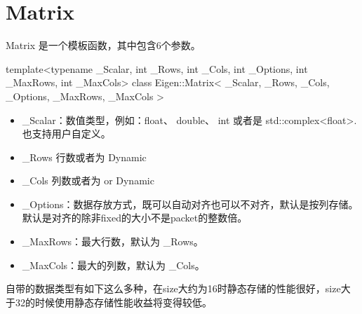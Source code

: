 \section{Matrix}
Matrix 是一个模板函数，其中包含6个参数。
\begin{cpp}
template<typename _Scalar, int _Rows, int _Cols, int _Options, int _MaxRows, int _MaxCols>
class Eigen::Matrix< _Scalar, _Rows, _Cols, _Options, _MaxRows, _MaxCols >
\end{cpp}
\begin{itemize}
\item \_Scalar：数值类型，例如：float、 double、 int 或者是 std::complex<float>.也支持用户自定义。
\item \_Rows	行数或者为 Dynamic
\item \_Cols	列数或者为 or Dynamic
\item \_Options：数据存放方式，既可以自动对齐也可以不对齐，默认是按列存储。默认是对齐的除非fixed的大小不是packet的整数倍。
\item \_MaxRows：最大行数，默认为 \_Rows。
\item \_MaxCols：最大的列数，默认为 \_Cols。 
\end{itemize}
自带的数据类型有如下这么多种，在size大约为16时静态存储的性能很好，size大于32的时候使用静态存储性能收益将变得较低。
